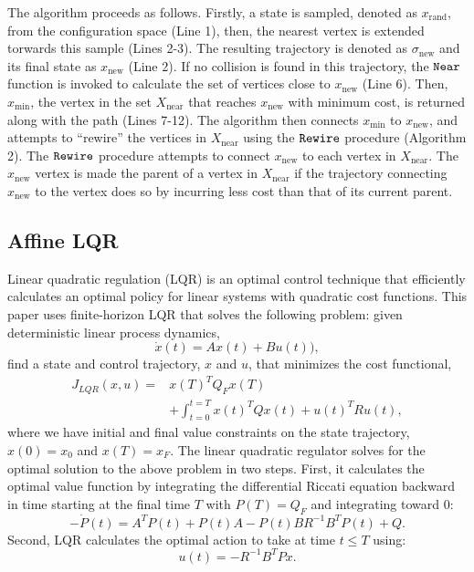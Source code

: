 The algorithm proceeds as follows.
Firstly, a state is sampled, denoted as
$x_\mathrm{rand}$, from the configuration space
(Line 1), then, the nearest vertex is extended torwards this sample (Lines 2-3). The resulting trajectory is denoted as $\sigma_\mathrm{new}$ and its final state as $x_\mathrm{new}$ (Line 2). If no collision is found in this trajectory, the ${\tt Near}$ function is invoked to calculate the set of vertices close to $x_\mathrm{new}$ (Line 6). Then, $x_\mathrm{min}$, the vertex in the set $X_\mathrm{near}$ that reaches $x_\mathrm{new}$ with minimum cost, is returned along with the path (Lines 7-12). 
The algorithm then connects $x_\mathrm{min}$ to
$x_\mathrm{new}$, and attempts to ``rewire'' the vertices in
$X_\mathrm{near}$ using the ${\tt Rewire}$ procedure (Algorithm 2). The ${\tt Rewire}$
procedure attempts to connect $x_\mathrm{new}$ to each vertex in $X_\mathrm{near}$. The $x_\mathrm{new}$ vertex is made the parent of a vertex in $X_\mathrm{near}$ if the trajectory connecting $x_\mathrm{new}$ to the vertex does so by incurring less cost than that of its current parent.

\subsection{Affine LQR}
\label{sect:affine_lqr}

Linear quadratic regulation (LQR) is an optimal control technique that
efficiently calculates an optimal policy for linear systems with
quadratic cost functions. This paper uses finite-horizon LQR that
solves the following problem: given deterministic linear process
dynamics,
\begin{equation}
\dot{x}(t) = Ax(t) + Bu(t)),
\label{eqn:linear_system}
\end{equation}
find a state and control trajectory, $x$ and $u$, that minimizes
the cost functional,
\begin{align} \nonumber
J_{LQR}(x,u) = & x(T)^T Q_F x(T) \\
& + \int_{t=0}^{t=T} x(t)^T Q x(t) + u(t)^T R u(t),
\label{eqn:lqr_cost}
\end{align}
where we have initial and final value constraints on the state
trajectory, $x(0) = x_0$ and $x(T) = x_F$. The linear quadratic
regulator solves for the optimal solution to the above problem in two
steps. First, it calculates the optimal value function by integrating
the differential Riccati equation backward in time starting at the
final time $T$ with $P(T) = Q_F$ and integrating toward $0$:
\[
-\dot{P}(t) = A^T P(t) + P(t) A - P(t) B R^{-1} B^T P(t) + Q.
\]
Second, LQR calculates the optimal action to take at time $t \leq T$
using:
\[
u(t) = -R^{-1} B^T P x.
\]

